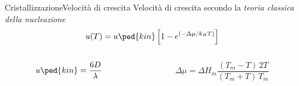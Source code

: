 \documentclass{beamer}
\begin{document}
\begin{frame}{Cristallizzazione}{Velocità di crescita}
 Velocità di crescita secondo la \emph{teoria classica della nucleazione}
  \begin{equation*}
    u(T)= u\ped{kin} \left[ 1- e^{ \left( -\Delta\mu/k_B T\right) } \right]
  \end{equation*}
 \begin{columns}[c]
  \begin{column}{0.5\textwidth}
  \centering
  \begin{displaymath}
   u\ped{kin}= \frac{6 D}{\lambda}
  \end{displaymath}
  \end{column}
%
  \begin{column}{0.5\textwidth}
  \centering
  \begin{displaymath}
   \Delta\mu = \Delta H_m \frac{(T_m-T)\,2T}{(T_m+T)\,T_m}
  \end{displaymath}
  \end{column}
 \end{columns}
\end{frame}
\end{document}
